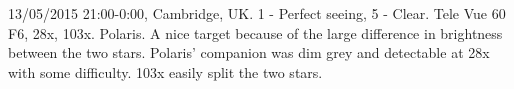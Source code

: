 \item 13/05/2015 21:00-0:00, Cambridge, UK. 1 - Perfect seeing, 5 - Clear. Tele Vue 60 F6, 28x, 103x. Polaris. A nice target because of the large difference in brightness between the two stars. Polaris' companion was dim grey and detectable at 28x with some difficulty. 103x easily split the two stars. 
